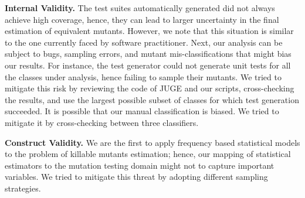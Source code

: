 \documentclass[sigconf,review,anonymous]{acmart}
\begin{document}
\noindent\textbf{Internal Validity.}
The test suites automatically generated did not always achieve high coverage, 
hence, they can lead to larger uncertainty in the final estimation of equivalent mutants. 
However, we note that this situation is similar to the one currently faced by software practitioner. %
%
Next, our analysis can be subject to bugs, sampling errors, and mutant mis-classifications
that might bias our results.
%
For instance, the test generator could not generate unit tests for all the classes under analysis,
hence failing to sample their mutants.
We tried to mitigate this risk by reviewing the code of JUGE and our scripts, 
cross-checking the results, and use the largest possible subset of classes for which
test generation succeeded.
It is possible that our manual classification is biased. We tried to mitigate it by cross-checking between three classifiers.

\noindent\textbf{Construct Validity.} We are the first to apply
frequency based statistical models %
to the problem of killable mutants estimation; hence, 
our mapping of statistical estimators to the mutation testing domain
might not to capture important variables. %
%
We tried to mitigate this threat by adopting different sampling strategies.
%
\end{document}
